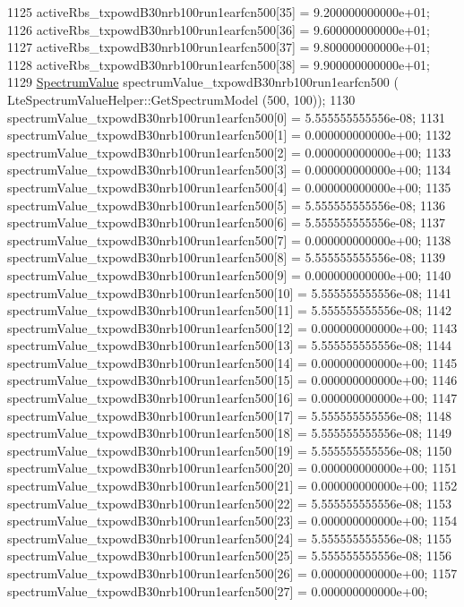 \begin{DoxyCode}
1125   activeRbs\_txpowdB30nrb100run1earfcn500[35] = 9.200000000000e+01;
1126   activeRbs\_txpowdB30nrb100run1earfcn500[36] = 9.600000000000e+01;
1127   activeRbs\_txpowdB30nrb100run1earfcn500[37] = 9.800000000000e+01;
1128   activeRbs\_txpowdB30nrb100run1earfcn500[38] = 9.900000000000e+01;
1129   \hyperlink{classns3_1_1SpectrumValue}{SpectrumValue} spectrumValue\_txpowdB30nrb100run1earfcn500 (
      LteSpectrumValueHelper::GetSpectrumModel (500, 100));
1130   spectrumValue\_txpowdB30nrb100run1earfcn500[0] = 5.555555555556e-08;
1131   spectrumValue\_txpowdB30nrb100run1earfcn500[1] = 0.000000000000e+00;
1132   spectrumValue\_txpowdB30nrb100run1earfcn500[2] = 0.000000000000e+00;
1133   spectrumValue\_txpowdB30nrb100run1earfcn500[3] = 0.000000000000e+00;
1134   spectrumValue\_txpowdB30nrb100run1earfcn500[4] = 0.000000000000e+00;
1135   spectrumValue\_txpowdB30nrb100run1earfcn500[5] = 5.555555555556e-08;
1136   spectrumValue\_txpowdB30nrb100run1earfcn500[6] = 5.555555555556e-08;
1137   spectrumValue\_txpowdB30nrb100run1earfcn500[7] = 0.000000000000e+00;
1138   spectrumValue\_txpowdB30nrb100run1earfcn500[8] = 5.555555555556e-08;
1139   spectrumValue\_txpowdB30nrb100run1earfcn500[9] = 0.000000000000e+00;
1140   spectrumValue\_txpowdB30nrb100run1earfcn500[10] = 5.555555555556e-08;
1141   spectrumValue\_txpowdB30nrb100run1earfcn500[11] = 5.555555555556e-08;
1142   spectrumValue\_txpowdB30nrb100run1earfcn500[12] = 0.000000000000e+00;
1143   spectrumValue\_txpowdB30nrb100run1earfcn500[13] = 5.555555555556e-08;
1144   spectrumValue\_txpowdB30nrb100run1earfcn500[14] = 0.000000000000e+00;
1145   spectrumValue\_txpowdB30nrb100run1earfcn500[15] = 0.000000000000e+00;
1146   spectrumValue\_txpowdB30nrb100run1earfcn500[16] = 0.000000000000e+00;
1147   spectrumValue\_txpowdB30nrb100run1earfcn500[17] = 5.555555555556e-08;
1148   spectrumValue\_txpowdB30nrb100run1earfcn500[18] = 5.555555555556e-08;
1149   spectrumValue\_txpowdB30nrb100run1earfcn500[19] = 5.555555555556e-08;
1150   spectrumValue\_txpowdB30nrb100run1earfcn500[20] = 0.000000000000e+00;
1151   spectrumValue\_txpowdB30nrb100run1earfcn500[21] = 0.000000000000e+00;
1152   spectrumValue\_txpowdB30nrb100run1earfcn500[22] = 5.555555555556e-08;
1153   spectrumValue\_txpowdB30nrb100run1earfcn500[23] = 0.000000000000e+00;
1154   spectrumValue\_txpowdB30nrb100run1earfcn500[24] = 5.555555555556e-08;
1155   spectrumValue\_txpowdB30nrb100run1earfcn500[25] = 5.555555555556e-08;
1156   spectrumValue\_txpowdB30nrb100run1earfcn500[26] = 0.000000000000e+00;
1157   spectrumValue\_txpowdB30nrb100run1earfcn500[27] = 0.000000000000e+00;

\end{DoxyCode}
